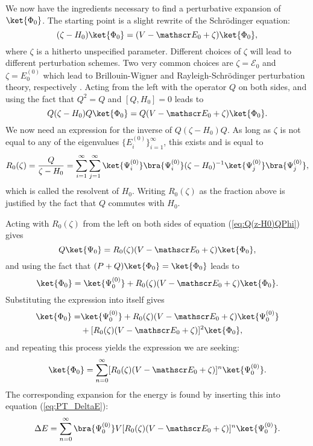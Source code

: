 We now have the ingredients necessary to find a perturbative expansion of $\ket{\Phi_0}$. The starting point is a slight rewrite of the Schrödinger equation:
\begin{equation}
 (\zeta - H_0) \ket{\Phi_0} = (V - \mathscr E_0 + \zeta)\ket{\Phi_0},
\end{equation}
where $\zeta$ is a hitherto unspecified parameter. Different choices of $\zeta$ will lead to different perturbation schemes. Two very common choices are
$\zeta = \mathscr E_0$ and $\zeta = E^{(0)}_0$ which lead to Brillouin-Wigner and Rayleigh-Schrödinger perturbation theory, respectively \cite{Bartlett}.
Acting from the left with the operator $Q$ on both sides, and using the fact that $Q^2 = Q$ and $[Q,H_0]=0$ leads to
\begin{equation}
\label{eq:Q(z-H0)QPhi}
 Q(\zeta - H_0)Q \ket{\Phi_0} = Q(V - \mathscr E_0 + \zeta)\ket{\Phi_0}.
\end{equation}
We now need an expression for the inverse of $Q(\zeta - H_0)Q$. As long as $\zeta$ is not equal to any of the eigenvalues $\{E^{(0)}_i\}_{i=1}^\infty$, this
exists and is equal to
\begin{equation}
 R_0(\zeta) = \frac{Q}{\zeta - H_0} = \sum_{i=1}^\infty\sum_{j=1}^\infty\ket{\Psi^{(0)}_i}\bra{\Psi^{(0)}_i}(\zeta - H_0)^{-1}\ket{\Psi^{(0)}_j}\bra{\Psi^{(0)}_j},
\end{equation}
which is called the resolvent of $H_0$. Writing $R_0(\zeta)$ as the fraction above is justified by the fact that $Q$ commutes with $H_0$.

Acting with $R_0(\zeta)$ from the left on both sides of equation (\ref{eq:Q(z-H0)QPhi}) gives
\begin{equation}
 Q\ket{\Psi_0} = R_0(\zeta)(V - \mathscr E_0 + \zeta)\ket{\Phi_0},
\end{equation}
and using the fact that $(P+Q)\ket{\Phi_0} = \ket{\Phi_0}$ leads to
\begin{equation}
 \ket{\Phi_0} = \ket{\Psi^{(0)}_0} + R_0(\zeta)(V - \mathscr E_0 + \zeta)\ket{\Phi_0}.
\end{equation}
Substituting the expression into itself gives
\begin{equation}
\begin{split}
 \ket{\Phi_0} = &             \ket{\Psi^{(0)}_0} + R_0(\zeta)(V - \mathscr E_0 + \zeta)\ket{\Psi^{(0)}_0} \\
	      & +  [R_0(\zeta)(V - \mathscr E_0 + \zeta)]^2\ket{\Phi_0},
 \end{split}
\end{equation}
and repeating this process yields the expression we are seeking:
\begin{equation}
 \ket{\Phi_0} = \sum_{n=0}^\infty [R_0(\zeta)(V - \mathscr E_0 + \zeta)]^n \ket{\Psi^{(0)}_0}.
\end{equation}
The corresponding expansion for the energy is found by inserting this into equation (\ref{eq:PT_DeltaE}):
\begin{equation}
 \Delta E = \sum_{n=0}^\infty \bra{\Psi^{(0)}_0}V[R_0(\zeta)(V - \mathscr E_0 + \zeta)]^n \ket{\Psi^{(0)}_0}.
\end{equation}


